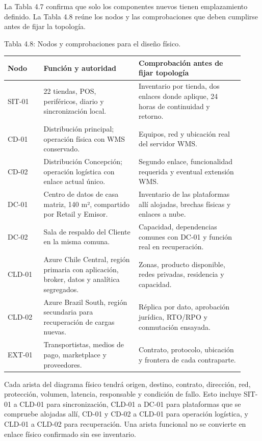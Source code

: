 \documentclass[11pt]{article}
\begin{document}
La Tabla 4.7 confirma que solo los componentes nuevos tienen emplazamiento definido. La Tabla 4.8 reúne los nodos y las comprobaciones que deben cumplirse antes de fijar la topología.

\par\vspace{0pt plus 10\baselineskip}\vspace{0pt plus -10\baselineskip}

Tabla 4.8: Nodos y comprobaciones para el diseño físico.\par\nopagebreak
\begin{longtable}{@{}p{0.14\linewidth}p{0.37\linewidth}p{0.41\linewidth}@{}}
\toprule Nodo & Función y autoridad & Comprobación antes de fijar topología \\
\midrule\endhead\bottomrule\endlastfoot
SIT-01 & 22 tiendas, POS, periféricos, diario y sincronización local. & Inventario por tienda, dos enlaces donde aplique, 24 horas de continuidad y retorno. \\
CD-01 & Distribución principal; operación física con WMS conservado. & Equipos, red y ubicación real del servidor WMS. \\
CD-02 & Distribución Concepción; operación logística con enlace actual único. & Segundo enlace, funcionalidad requerida y eventual extensión WMS. \\
DC-01 & Centro de datos de casa matriz, 140 m², compartido por Retail y Emisor. & Inventario de las plataformas allí alojadas, brechas físicas y enlaces a nube. \\
DC-02 & Sala de respaldo del Cliente en la misma comuna. & Capacidad, dependencias comunes con DC-01 y función real en recuperación. \\
CLD-01 & Azure Chile Central, región primaria con aplicación, broker, datos y analítica segregados. & Zonas, producto disponible, redes privadas, residencia y capacidad. \\
CLD-02 & Azure Brazil South, región secundaria para recuperación de cargas nuevas. & Réplica por dato, aprobación jurídica, RTO/RPO y conmutación ensayada. \\
EXT-01 & Transportistas, medios de pago, marketplace y proveedores. & Contrato, protocolo, ubicación y frontera de cada contraparte. \\
\end{longtable}

Cada arista del diagrama físico tendrá origen, destino, contrato, dirección, red, protección, volumen, latencia, responsable y condición de fallo. Esto incluye SIT-01 a CLD-01 para sincronización, CLD-01 a DC-01 para plataformas que se compruebe alojadas allí, CD-01 y CD-02 a CLD-01 para operación logística, y CLD-01 a CLD-02 para recuperación. Una arista funcional no se convierte en enlace físico confirmado sin ese inventario.
\end{document}
